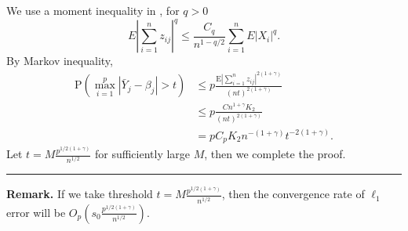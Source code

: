 \documentclass[12pt]{article}
\numberwithin{equation}{section}
\newenvironment{proof}{{\bf Proof:}}{\hfill\rule{2mm}{2mm}}
\begin{document}
\begin{proof}
	We use a moment inequality in \citet{shao2003mathematical}, for $q>0$
	\begin{equation}
	E\left|\sum_{i=1}^{n} z_{ij}\right|^{q} \leq \frac{C_{q}}{n^{1-q / 2}} \sum_{i=1}^{n} E\left|X_{i}\right|^{q}.
	\end{equation}
	By Markov inequality,
	\begin{align*}
	\mathrm{P}\left(\max _{i=1}^{p}\left|\bar Y_{j}-\beta_{j}\right|>t\right)&\leq p\frac{\mathrm{E}\left|\sum_{i=1}^nz_{ij}\right|^{2(1+\gamma)}}{(nt)^{2(1+\gamma)}}\\
	&\leq p\frac{Cn^{1+\gamma}K_2}{(nt)^{2(1+\gamma)}}\\
	&=pC_pK_2n^{-(1+\gamma)}t^{-2(1+\gamma)}.
	\end{align*}
	Let $t=M\frac{p^{1/2(1+\gamma)}}{n^{1/2}}$ for sufficiently large $M$, then we complete the proof.
\end{proof}\newline
\textbf{Remark.} If we take threshold $t=M\frac{p^{1/2(1+\gamma)}}{n^{1/2}}$, then the convergence rate of $\ell_1$ error will be $O_p(s_0\frac{p^{1/2(1+\gamma)}}{n^{1/2}})$.
\end{document}
